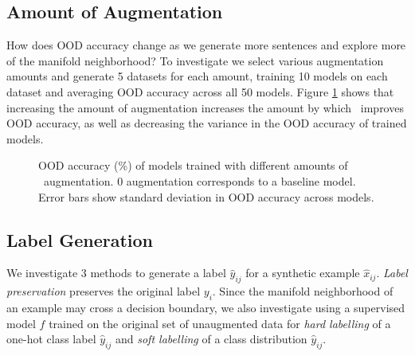 \subsection{Amount of Augmentation}
\label{subsec:aug_amount_exp}
How does OOD accuracy change as we generate more sentences and explore more of the manifold neighborhood?
To investigate we select various augmentation amounts and generate 5 datasets for each amount, training 10 models on each dataset and averaging OOD accuracy across all 50 models.
Figure \ref{fig:num_exp} shows that increasing the amount of augmentation increases the amount by which \ssmba\ improves OOD accuracy, as well as decreasing the variance in the OOD accuracy of trained models.

\begin{figure}[t]
\centering
{}
\caption{OOD accuracy (\%) of models trained with different amounts of \ssmba\ augmentation. 0 augmentation corresponds to a baseline model. Error bars show standard deviation in OOD accuracy across models.}
\label{fig:num_exp}
\end{figure}



\subsection{Label Generation}
\label{subsec:label_gen_exp}
We investigate 3 methods to generate a label $\hat{y}_{ij}$ for a synthetic example $\hat{x}_{ij}$.
\textit{Label preservation} preserves the original label $y_i$.
Since the manifold neighborhood of an example may cross a decision boundary, we also investigate using a supervised model $f$ trained on the original set of unaugmented data for
\textit{hard labelling} of a one-hot class label $\hat{y}_{ij}$ and \textit{soft labelling} of a class distribution $\hat{y}_{ij}$.

